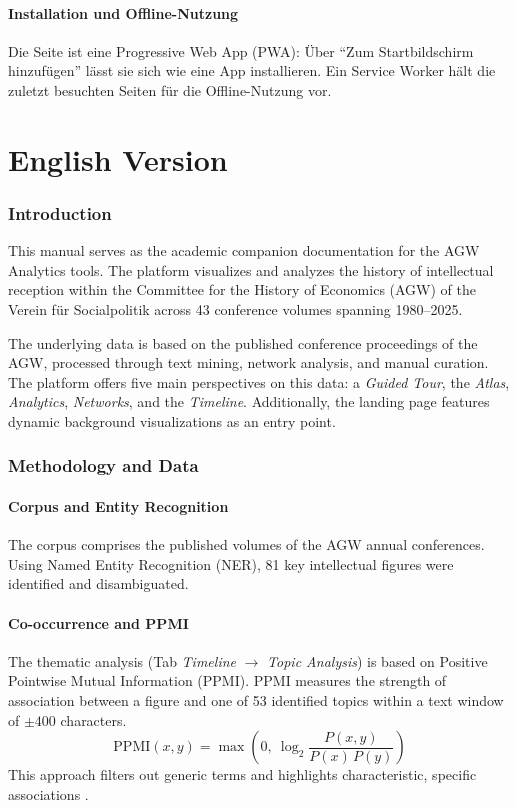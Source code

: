 \documentclass[11pt,a4paper,twoside]{article}
\begin{document}
\subsection{Installation und Offline-Nutzung}
Die Seite ist eine Progressive Web App (PWA): Über ``Zum Startbildschirm hinzufügen'' lässt sie sich wie eine App installieren. Ein Service Worker hält die zuletzt besuchten Seiten für die Offline-Nutzung vor.

\clearpage
\part{English Version}
\setcounter{section}{0}

\section{Introduction}
This manual serves as the academic companion documentation for the AGW Analytics tools. The platform visualizes and analyzes the history of intellectual reception within the Committee for the History of Economics (AGW) of the Verein für Socialpolitik across 43 conference volumes spanning 1980--2025.

The underlying data is based on the published conference proceedings of the AGW, processed through text mining, network analysis, and manual curation. The platform offers five main perspectives on this data: a \textit{Guided Tour}, the \textit{Atlas}, \textit{Analytics}, \textit{Networks}, and the \textit{Timeline}. Additionally, the landing page features dynamic background visualizations as an entry point.

\section{Methodology and Data}
\subsection{Corpus and Entity Recognition}
The corpus comprises the published volumes of the AGW annual conferences. Using Named Entity Recognition (NER), 81 key intellectual figures were identified and disambiguated.

\subsection{Co-occurrence and PPMI}
The thematic analysis (Tab \textit{Timeline} $\rightarrow$ \textit{Topic Analysis}) is based on Positive Pointwise Mutual Information (PPMI). PPMI measures the strength of association between a figure and one of 53 identified topics within a text window of $\pm 400$ characters.
\begin{equation}
    \mathrm{PPMI}(x,y) = \max\!\left(0,\ \log_2 \frac{P(x,y)}{P(x)\,P(y)}\right)
\end{equation}
This approach filters out generic terms and highlights characteristic, specific associations \cite{jurafsky2000}.
\end{document}
